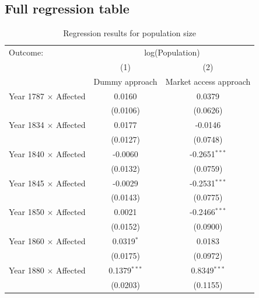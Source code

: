 \subsection{Full regression table}  \label{pop_reg_table}
\FloatBarrier
\begin{table}[H]
\centering
\caption{Regression results for population size} \label{tab:pop1}
\footnotesize
\begin{tabular}{lcc}
   \tabularnewline \midrule \midrule
   Outcome: & \multicolumn{2}{c}{log(Population)}\\
                                                    & (1)             & (2)\\  
                                                    & Dummy approach  & Market access approach\\  
   \midrule
   Year 1787 $\times$ Affected                       & 0.0160          & 0.0379\\   
                                                     & (0.0106)        & (0.0626)\\   
   Year 1834 $\times$ Affected                       & 0.0177          & -0.0146\\   
                                                     & (0.0127)        & (0.0748)\\   
   Year 1840 $\times$ Affected                       & -0.0060         & -0.2651$^{***}$\\   
                                                     & (0.0132)        & (0.0759)\\   
   Year 1845 $\times$ Affected                       & -0.0029         & -0.2531$^{***}$\\   
                                                     & (0.0143)        & (0.0775)\\   
   Year 1850 $\times$ Affected                       & 0.0021          & -0.2466$^{***}$\\   
                                                     & (0.0152)        & (0.0900)\\   
   Year 1860 $\times$ Affected                       & 0.0319$^{*}$    & 0.0183\\   
                                                     & (0.0175)        & (0.0972)\\   
   Year 1880 $\times$ Affected                       & 0.1379$^{***}$  & 0.8349$^{***}$\\   
                                                     & (0.0203)        & (0.1155)\\   

\end{tabular}
\end{table}
